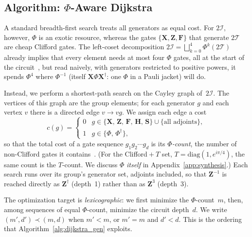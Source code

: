 \documentclass[11pt, oneside, openany]{scrbook}
\newcommand{\Tgroup}{\mathcal{T}}  %
\newcommand{\Igroup}{\mathcal{I}}  %
\newcommand{\TwoT}{2\Tgroup}
\newcommand{\TwoI}{2\Igroup}
\begin{document}
\subsection{Algorithm: \texorpdfstring{$\Phi$}{Φ}-Aware Dijkstra} \label{sec:magicawaredijkstra}

A standard breadth-first search treats all generators as equal cost. For $\TwoI$, however, $\Phi$ is an exotic resource, whereas the gates $\{\mathbf{X}, \mathbf{Z}, \mathbf{F}\}$ that generate $\TwoT$ are cheap Clifford gates. The left-coset decomposition $\TwoI = \bigsqcup_{k=0}^4 \Phi^k (\TwoT)$ already implies that every element needs at most four $\Phi$ gates, all at the start of the circuit~\cite{kubischta2023familyquantumcodes}, but read naively, with generators restricted to positive powers, it spends $\Phi^4$ where $\Phi^{-1}$ (itself $\mathbf{X} \Phi \mathbf{X}^\dagger$: one $\Phi$ in a Pauli jacket) will do.

Instead, we perform a shortest-path search on the Cayley graph of~$\TwoI$. The vertices of this graph are the group elements; for each generator $g$ and each vertex $v$ there is a directed edge $v \to vg$. We assign each edge a cost
\begin{equation*}
    c(g) =
    \begin{cases}
        0 & g \in \{\mathbf{X},\, \mathbf{Z},\, \mathbf{F},\, \mathbf{H},\, \mathbf{S}\} \cup \{\text{all adjoints}\}, \\[4pt]
        1 & g \in \{\Phi,\, \Phi^\dagger\},
    \end{cases}
\end{equation*}
so that the total cost of a gate sequence $g_1 g_2 \cdots g_d$ is its \textit{$\Phi$-count}, the number of non-Clifford gates it contains~\cite{mooney2021costoptimalsinglequbitgate}. (For the Clifford${}+T$ set, $T = \mathrm{diag}(1, e^{i\pi/4})$, the same count is the $T$-count. We discuss $\Phi$ \textit{itself} in Appendix~\ref{app:synthesis}.) Each search runs over its group's generator set, adjoints included, so that $\mathbf{Z}^{-1}$ is reached directly as $\mathbf{Z}^\dagger$ (depth~1) rather than as $\mathbf{Z}^3$ (depth~3).

The optimization target is \textit{lexicographic}: we first minimize the $\Phi$-count~$m$, then, among sequences of equal $\Phi$-count, minimize the circuit depth~$d$. We write $(m', d') \prec (m, d)$ when $m' < m$, or $m' = m$ and $d' < d$. This is the ordering that Algorithm~\ref{alg:dijkstra_gen} exploits.
\end{document}
